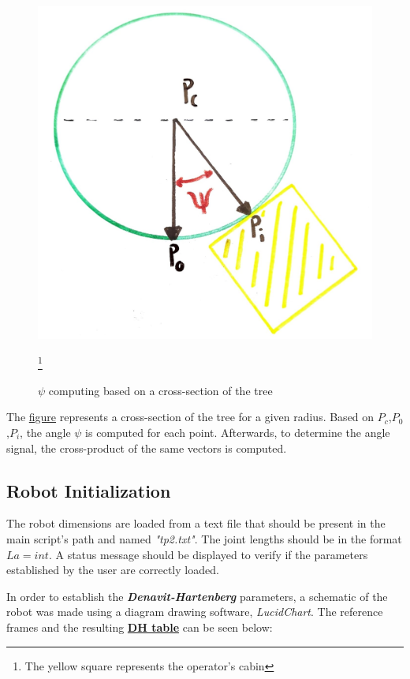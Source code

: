 \documentclass{report}
\begin{document}
\begin{figure}[h]
    \centering
    \includegraphics[scale=0.1]{resources/psi.jpeg}
    \caption{\label{fig:psi}$\psi$ computing based on a cross-section of the
        tree}
    \footnote{The yellow square represents the operator's cabin}
\end{figure}

The \hyperref[fig:psi]{figure} represents a cross-section of the tree for a given radius.
Based on $P_c$,$P_0$,$P_i$, the angle $\psi$ is computed for each
point. Afterwards, to determine the angle signal, the cross-product of the same
vectors is computed.

\subsection{Robot Initialization}

The robot dimensions are loaded from a text file that should be present in the
main script's path and named \textit{"tp2.txt"}. The joint lengths should be in
the format $La = int$. A status message should be displayed to verify if the
parameters established by the user are correctly loaded.

In order to establish the \textit{\textbf{Denavit-Hartenberg}} parameters, a
schematic of the robot was made using a diagram drawing
software, \textit{LucidChart}. The reference frames and the resulting \hyperref[tab:dh]{\textbf{DH table}}
can be seen below:
\end{document}
